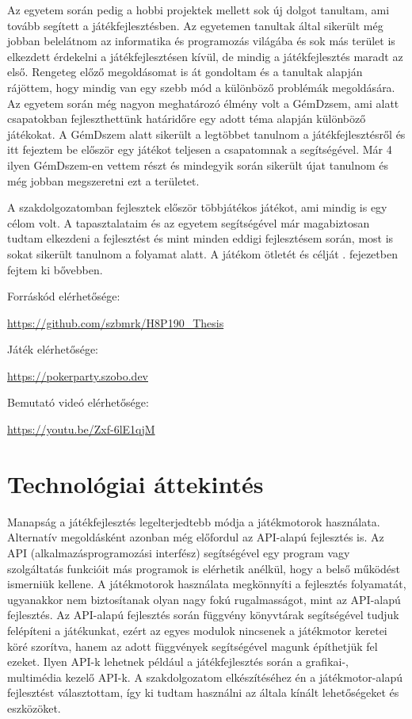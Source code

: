 \documentclass[]{thesis-ekf}
\theoremstyle{definition}
\theoremstyle{remark}
\begin{document}
Az egyetem során pedig a hobbi projektek mellett sok új dolgot tanultam, ami tovább segített a játékfejlesztésben. Az egyetemen tanultak által sikerült még jobban belelátnom az informatika és programozás világába és sok más terület is elkezdett érdekelni a játékfejlesztésen kívül, de mindig a játékfejlesztés maradt az első. Rengeteg előző megoldásomat is át gondoltam és a tanultak alapján rájöttem, hogy mindig van egy szebb mód a különböző problémák megoldására. Az egyetem során még nagyon meghatározó élmény volt a GémDzsem, ami alatt csapatokban fejleszthettünk határidőre egy adott téma alapján különböző játékokat. A GémDszem alatt sikerült a legtöbbet tanulnom a játékfejlesztésről és itt fejeztem be először egy játékot teljesen a csapatomnak a segítségével. Már 4 ilyen GémDszem-en vettem részt és mindegyik során sikerült újat tanulnom és még jobban megszeretni ezt a területet.

A szakdolgozatomban fejlesztek először többjátékos játékot, ami mindig is egy célom volt. A tapasztalataim és az egyetem segítségével már magabiztosan tudtam elkezdeni a fejlesztést és mint minden eddigi fejlesztésem során, most is sokat sikerült tanulnom a folyamat alatt. A játékom ötletét és célját . fejezetben fejtem ki bővebben.

\begin{center}
	Forráskód elérhetősége:
	
	{\color{teal}\url{https://github.com/szbmrk/H8P190_Thesis}}
	
	Játék elérhetősége:
	
	{\color{teal}\url{https://pokerparty.szobo.dev}}
	
	Bemutató videó elérhetősége:
	
	{\color{teal}\url{https://youtu.be/Zxf-6lE1qjM}}
\end{center}
	
\chapter{Technológiai áttekintés}

Manapság a játékfejlesztés legelterjedtebb módja a játékmotorok használata. Alternatív megoldásként azonban még előfordul az API-alapú fejlesztés is. Az API (alkalmazásprogramozási interfész) segítségével egy program vagy szolgáltatás funkcióit más programok is elérhetik anélkül, hogy a belső működést ismerniük kellene. A játékmotorok használata megkönnyíti a fejlesztés folyamatát, ugyanakkor nem biztosítanak olyan nagy fokú rugalmasságot, mint az API-alapú fejlesztés. Az API-alapú fejlesztés során függvény könyvtárak segítségével tudjuk felépíteni a játékunkat, ezért az egyes modulok nincsenek a játékmotor keretei köré szorítva, hanem az adott függvények segítségével magunk építhetjük fel ezeket. Ilyen API-k lehetnek például a játékfejlesztés során a grafikai-, multimédia kezelő API-k. A szakdolgozatom elkészítéséhez én a játékmotor-alapú fejlesztést választottam, így ki tudtam használni az általa kínált lehetőségeket és eszközöket.
\end{document}
